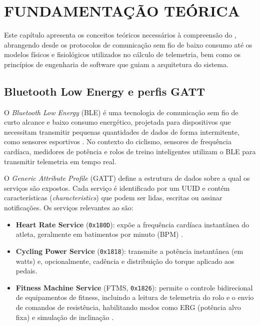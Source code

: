 
\chapter{FUNDAMENTAÇÃO TEÓRICA}
\label{cap:fundamentacao}

Este capítulo apresenta os conceitos teóricos necessários à compreensão do
\argus{}, abrangendo desde os protocolos de comunicação sem fio de baixo
consumo até os modelos físicos e fisiológicos utilizados no cálculo de
telemetria, bem como os princípios de engenharia de software que guiam a
arquitetura do sistema.

\section{Bluetooth Low Energy e perfis GATT}
\label{sec:ble-gatt}

O \textit{Bluetooth Low Energy} (BLE) é uma tecnologia de comunicação sem fio
de curto alcance e baixo consumo energético, projetada para dispositivos que
necessitam transmitir pequenas quantidades de dados de forma intermitente,
como sensores esportivos \cite{bluetooth2017}. No contexto do ciclismo, sensores
de frequência cardíaca, medidores de potência e rolos de treino inteligentes
utilizam o BLE para transmitir telemetria em tempo real.

O \textit{Generic Attribute Profile} (GATT) define a estrutura de dados sobre a
qual os serviços são expostos. Cada serviço é identificado por um UUID e contém
características (\textit{characteristics}) que podem ser lidas, escritas ou
assinar notificações. Os serviços relevantes ao \argus{} são:

\begin{itemize}
    \item \textbf{Heart Rate Service} (\texttt{0x180D}): expõe a frequência
        cardíaca instantânea do atleta, geralmente em batimentos por minuto
        (BPM) \cite{bluetooth2017}.
    \item \textbf{Cycling Power Service} (\texttt{0x1818}): transmite a
        potência instantânea (em watts) e, opcionalmente, cadência e
        distribuição do torque aplicado aos pedais.
    \item \textbf{Fitness Machine Service} (FTMS, \texttt{0x1826}): permite o
        controle bidirecional de equipamentos de fitness, incluindo a leitura
        de telemetria do rolo e o envio de comandos de resistência, habilitando
        modos como ERG (potência alvo fixa) e simulação de inclinação
        \cite{bluetooth2017}.
\end{itemize}

